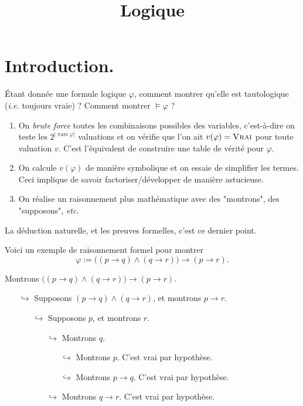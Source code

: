\documentclass{../notes}
\title{Logique}
\begin{document}
  \section{Introduction.}

  Étant donnée une formule logique $\varphi$, comment montrer qu'elle est tautologique (\textit{i.e.} toujours vraie) ? Comment montrer $\models \varphi$ ?
  \begin{enumerate}
    \item On \textit{brute force} toutes les combinaisons possibles des variables, c'est-à-dire on teste les $2^{|{\operatorname{vars} \varphi}|}$ valuations et on vérifie que l'on ait $v(\varphi) = \textsc{Vrai}$ pour toute valuation $v$.
      C'est l'équivalent de construire une table de vérité pour $\varphi$.
    \item On calcule $v(\varphi)$ de manière symbolique et on essaie de simplifier les termes.
      Ceci implique de savoir factoriser/développer de manière astucieuse. 
    \item On réalise un raisonnement plus mathématique avec des "montrons", des "supposons", \textit{etc}.
  \end{enumerate}

  La déduction naturelle, et les preuves formelles, c'est ce dernier point.

  Voici un exemple de raisonnement formel pour montrer \[
    \varphi := \big((p \to q) \land (q \to r)\big) \to (p \to r)
  .\]
  \begin{exm}
    \label{ex1}
    Montrons $\big((p \to q) \land (q \to r)\big) \to (p \to r)$.
    \begin{itemize}
      \item[$\hookrightarrow$] Supposons $(p\to q) \land (q \to r)$, et montrons $p \to r$.
        \begin{itemize}
          \item[$\hookrightarrow$] Supposons $p$, et montrons $r$.
            \begin{itemize}
              \item[$\hookrightarrow$] Montrons $q$.
                \begin{itemize}
                  \item[$\hookrightarrow$] Montrons $p$. C'est vrai par hypothèse.
                  \item[$\hookrightarrow$] Montrons $p \to q$. C'est vrai par hypothèse.
                \end{itemize}
              \item[$\hookrightarrow$] Montrons $q \to r$. C'est vrai par hypothèse.
            \end{itemize}
        \end{itemize}
    \end{itemize}
  \end{exm}
\end{document}
